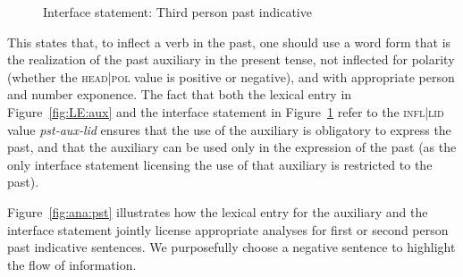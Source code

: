 \documentclass[output=paper]{langsci/langscibook}
\begin{document}
\begin{figure}
\caption{Interface statement: Third person past indicative\label{fig:pst}}
\end{figure}

This states that, to inflect a verb in the past, one should use a word form that is the realization of the past auxiliary in the present tense, not inflected for polarity (whether  the \textsc{head|pol} value is positive or negative), and with appropriate person and number exponence. The fact that both the lexical entry in Figure~\ref{fig:LE:aux} and the interface statement in Figure~\ref{fig:pst} refer to the \textsc{infl|lid} value \textit{pst-aux-lid} ensures that the use of the auxiliary is obligatory to express the past, and that the auxiliary can be used only in the expression of the past (as the only interface statement licensing the use of that auxiliary is restricted to the past).

Figure~\ref{fig:ana:pst} illustrates how the lexical entry for the auxiliary and the interface statement jointly license appropriate analyses for first or second person past indicative sentences. We purposefully choose a negative sentence to highlight the flow of information. 
\end{document}
